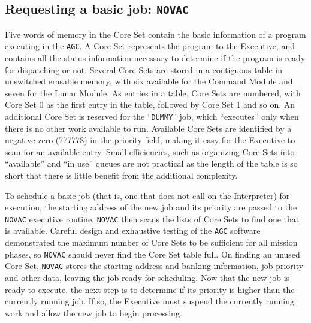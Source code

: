 \documentclass[refcap, oxford]{ahsan}
\begin{document}
\subsection{Requesting a basic job: \texttt{NOVAC}}

Five words of memory in the Core Set contain the basic information of a program executing in the \texttt{AGC}. A Core Set represents the program to the Executive, and contains all the status information necessary to determine if the program is ready for dispatching or not. Several Core Sets are stored in a contiguous table in unswitched erasable memory, with six available for the Command Module and seven for the Lunar Module. As entries in a table, Core Sets are numbered, with Core Set 0 as the first entry in the table, followed by Core Set 1 and so on. An additional Core Set is reserved for the ``\texttt{DUMMY}'' job, which ``executes'' only when there is no other work available to run. Available Core Sets are identified by a negative-zero (777778) in the priority field, making it easy for the Executive to scan for an available entry. Small efficiencies, such as organizing Core Sets into ``available'' and ``in use'' queues are not practical as the length of the table is so short that there is little benefit from the additional complexity.

To schedule a basic job (that is, one that does not call on the Interpreter) for execution, the starting address of the new job and its priority are passed to the \texttt{NOVAC} executive routine. \texttt{NOVAC} then scans the lists of Core Sets to find one that is available. Careful design and exhaustive testing of the \texttt{AGC} software demonstrated the maximum number of Core Sets to be sufficient for all mission phases, so \texttt{NOVAC} should never find the Core Set table full. On finding an unused Core Set, \texttt{NOVAC} stores the starting address and banking information, job priority and other data, leaving the job ready for scheduling. Now that the new job is ready to execute, the next step is to determine if its priority is higher than the currently running job. If so, the Executive must suspend the currently running work and allow the new job to begin processing.
\end{document}
